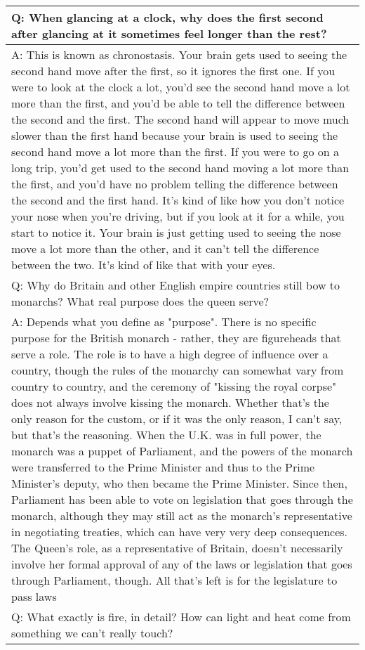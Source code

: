 \documentclass[11pt]{article}
\begin{document}
\begin{table*}[t]
\begin{tabular}{p{}}
  \midrule
  Q: When glancing at a clock, why does the first second after glancing at it sometimes feel longer than the rest?\\
  \midrule
  A: This is known as chronostasis. Your brain gets used to seeing the second hand move after the first, so it ignores the first one. If you were to look at the clock a lot, you'd see the second hand move a lot more than the first, and you'd be able to tell the difference between the second and the first. The second hand will appear to move much slower than the first hand because your brain is used to seeing the second hand move a lot more than the first. If you were to go on a long trip, you'd get used to the second hand moving a lot more than the first, and you'd have no problem telling the difference between the second and the first hand. It's kind of like how you don't notice your nose when you're driving, but if you look at it for a while, you start to notice it. Your brain is just getting used to seeing the nose move a lot more than the other, and it can't tell the difference between the two. It's kind of like that with your eyes. \\
  \midrule
  Q: Why do Britain and other English empire countries still bow to monarchs? What real purpose does the queen serve?\\
  \midrule
  A: Depends what you define as "purpose". There is no specific purpose for the British monarch - rather, they are figureheads that serve a role. The role is to have a high degree of influence over a country, though the rules of the monarchy can somewhat vary from country to country, and the ceremony of "kissing the royal corpse" does not always involve kissing the monarch. Whether that's the only reason for the custom, or if it was the only reason, I can't say, but that's the reasoning. When the U.K. was in full power, the monarch was a puppet of Parliament, and the powers of the monarch were transferred to the Prime Minister and thus to the Prime Minister's deputy, who then became the Prime Minister. Since then, Parliament has been able to vote on legislation that goes through the monarch, although they may still act as the monarch's representative in negotiating treaties, which can have very very deep consequences. The Queen's role, as a representative of Britain, doesn't necessarily involve her formal approval of any of the laws or legislation that goes through Parliament, though. All that's left is for the legislature to pass laws \\
  \midrule
  Q: What exactly is fire, in detail? How can light and heat come from something we can't really touch? \\

\end{tabular}
\end{table*}
\end{document}
